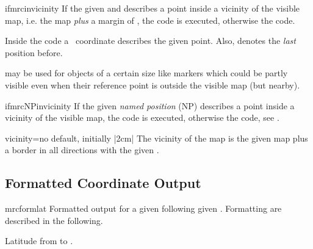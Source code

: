 \begin{docCommand}{ifmrcinvicinity}{}
  If the given  and  describes a point
  inside a vicinity of the visible map, i.e. the map \emph{plus} a margin of ,
  the  code is executed, otherwise
  the  code.\par
  Inside the  code a \tikzname\ coordinate 
  describes the given point. Also,  denotes the
  \emph{last} position before.\par
   may be used for objects of a certain size like
  markers which could be partly visible even when their reference point
  is outside the visible map (but nearby).
\begin{dispListing}
\end{dispListing}
\end{docCommand}


\begin{docCommand}{ifmrcNPinvicinity}{}
  If the given \emph{named position} (NP)  describes a point
  inside a vicinity of the visible map, the  code is executed, otherwise
  the  code, see .
\begin{dispListing}
\end{dispListing}
\end{docCommand}


\begin{docMrcKey}{vicinity}{=}{no default, initially |2cm|}
  The vicinity of the map is the given map plus a border in all directions
  with the given .
\end{docMrcKey}


\clearpage
\subsection{Formatted Coordinate Output}

\begin{docCommand}{mrcformlat}{}
  Formatted output for a given  following given .
  Formatting  are described in the following.
  \begin{dispExample}
    Latitude from  to .
  \end{dispExample}
\end{docCommand}

